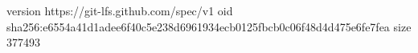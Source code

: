 version https://git-lfs.github.com/spec/v1
oid sha256:e6554a41d1adee6f40c5e238d6961934ecb0125fbcb0c06f48d4d475e6fe7fea
size 377493
